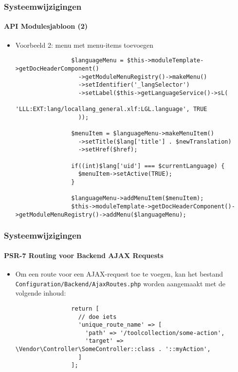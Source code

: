 \begin{frame}[fragile]
	\frametitle{Systeemwijzigingen}
	\framesubtitle{API Modulesjabloon (2)}

	\lstset{basicstyle=\tiny\ttfamily}

	\begin{itemize}
		\item Voorbeeld 2: menu met menu-items toevoegen

			\begin{lstlisting}
				$languageMenu = $this->moduleTemplate->getDocHeaderComponent()
				  ->getModuleMenuRegistry()->makeMenu()
				  ->setIdentifier('_langSelector')
				  ->setLabel($this->getLanguageService()->sL(
				    'LLL:EXT:lang/locallang_general.xlf:LGL.language', TRUE
				  ));

				$menuItem = $languageMenu->makeMenuItem()
				  ->setTitle($lang['title'] . $newTranslation)
				  ->setHref($href);

				if((int)$lang['uid'] === $currentLanguage) {
				  $menuItem->setActive(TRUE);
				}

				$languageMenu->addMenuItem($menuItem);
				$this->moduleTemplate->getDocHeaderComponent()->getModuleMenuRegistry()->addMenu($languageMenu);
			\end{lstlisting}
	\end{itemize}

\end{frame}



\begin{frame}[fragile]
	\frametitle{Systeemwijzigingen}
	\framesubtitle{PSR-7 Routing voor Backend AJAX Requests}

	\lstset{basicstyle=\tiny\ttfamily}

	\begin{itemize}

		\item Om een route voor een AJAX-request toe te voegen, kan het bestand
			\texttt{Configuration/Backend/AjaxRoutes.php}\newline
			worden aangemaakt met de volgende inhoud:

			\begin{lstlisting}
				return [
				  // doe iets
				  'unique_route_name' => [
				    'path' => '/toolcollection/some-action',
				    'target' => \Vendor\Controller\SomeController::class . '::myAction',
				  ]
				];
			\end{lstlisting}

	\end{itemize}

\end{frame}

